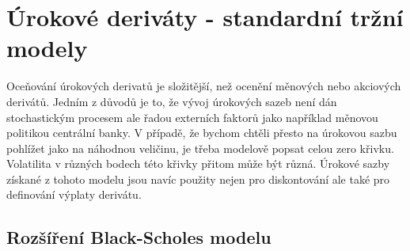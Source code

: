 \documentclass[a4paper]{book}
\begin{document}
\chapter{Úrokové deriváty - standardní tržní modely}

Oceňování úrokových derivatů je složitější, než ocenění měnových nebo akciových derivátů. Jedním z důvodů je to, že vývoj úrokových sazeb není dán stochastickým procesem ale řadou externích faktorů jako například měnovou politikou centrální banky. V případě, že bychom chtěli přesto na úrokovou sazbu pohlížet jako na náhodnou veličinu, je třeba modelově popsat celou zero křivku. Volatilita v různých bodech této křivky přitom může být různá. Úrokové sazby získané z tohoto modelu jsou navíc použity nejen pro diskontování ale také pro definování výplaty derivátu.

\section{Rozšíření Black-Scholes modelu}
\end{document}
